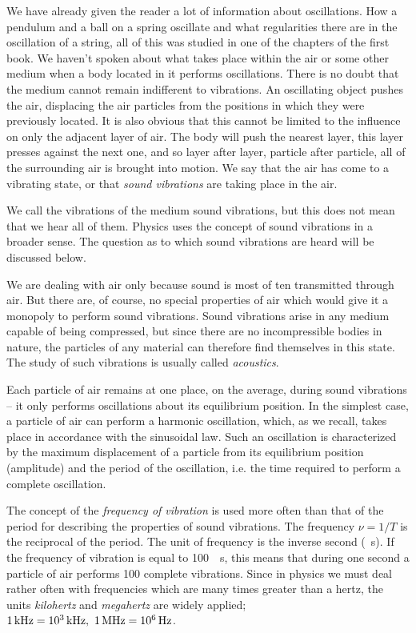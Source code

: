We have already given the reader a lot of information about oscillations. How a pendulum and a ball on a spring oscillate and what regularities there are in the oscillation of a string, all of this was studied in one of the chapters of the first book. We haven’t spoken about what takes place within the air or some other medium when a body located in it performs oscillations. There is no doubt that the medium cannot remain indifferent to vibrations. An oscillating object pushes the air, displacing the air particles from the positions in which they were previously located. It is also obvious that this cannot be limited to the influence on only the adjacent layer of air. The body will push the nearest layer, this layer presses against the next one, and so layer after layer, particle after particle, all of the surrounding air is brought into motion. We say that the air has come to a vibrating state, or that \emph{sound vibrations} are taking place in the air.

We call the vibrations of the medium sound vibrations, but this does not mean that we hear all of them. Physics uses the concept of sound vibrations in a broader sense. The question as to which sound vibrations are heard will be discussed below.

We are dealing with air only because sound is most of­ ten transmitted through air. But there are, of course, no special properties of air which would give it a monopoly to perform sound vibrations. Sound vibrations arise in any medium capable of being compressed, but since there are no incompressible bodies in nature, the particles of any material can therefore find themselves in this state. The study of such vibrations is usually called \emph{acoustics}.

Each particle of air remains at one place, on the av­erage, during sound vibrations -- it only performs oscilla­tions about its equilibrium position. In the simplest case, a particle of air can perform a harmonic oscillation, which, as we recall, takes place in accordance with the sinusoidal law. Such an oscillation is characterized by the maximum displacement of a particle from its equilibrium position (amplitude) and the period of the oscillation, i.e. the time required to perform a complete oscillation.

The concept of the \emph{frequency of vibration} is used more often than that of the period for describing the properties of sound vibrations. The frequency $\nu = 1/T$ is the recip­rocal of the period. The unit of frequency is the inverse second (\si{\per\second}). If the frequency of vibration is equal to \SI{100}{\per\second}, this means that during one second a particle of air performs 100 complete vibrations. Since in physics we must deal rather often with frequencies which are many times greater than a hertz, the units \emph{kilohertz} and \emph{megahertz} are widely applied; $\SI{1}{\kilo\hertz} = \SI{d3}{\kilo\hertz},\,\, \SI{1}{\mega\hertz} = \SI{d6}{\hertz}$.

